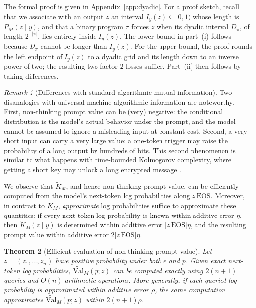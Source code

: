 \documentclass[letterpaper]{article} %
\newtheorem{theorem}{Theorem}[section]
\theoremstyle{definition}
\theoremstyle{remark}
\newtheorem{remark}[theorem]{Remark}
\newcommand{\Val}{\mathrm{Val}}
\newcommand{\eps}{\epsilon}
\newcommand{\EOS}{\mathrm{EOS}}
\begin{document}
The formal proof is given in Appendix~\ref{app:dyadic}. 
For a proof sketch, recall that we associate with an output \(z\) an interval
\(I_y(z)\subseteq[0,1)\) whose length is \(P_M(z\mid y)\), and that a binary
program \(\pi\) forces \(z\) when its dyadic interval \(D_\pi\), of length
\(2^{-|\pi|}\), lies entirely inside \(I_y(z)\). The lower bound in part~(i)
follows because \(D_\pi\) cannot be longer than \(I_y(z)\). For the upper
bound, the proof rounds the left endpoint of \(I_y(z)\) to a dyadic grid and
its length down to an inverse power of two; the resulting two factor-\(2\)
losses suffice. Part~(ii) then follows by taking differences.


\begin{remark}[Differences with standard algorithmic mutual information]\label{rem:leverage}
Two disanalogies with universal-machine algorithmic information are
noteworthy. First, non-thinking prompt value can be (very) negative: the conditional
distribution is the model's actual behavior under the prompt, and the model
cannot be assumed to ignore a misleading input at constant cost. Second, a
very short input can carry a very large value: a one-token trigger may raise
the probability of a long output by hundreds of bits. This second phenomenon
is similar to what happens with time-bounded Kolmogorov complexity, where
getting a short key may unlock a long encrypted message \cite{LM93}.
\end{remark}


We observe that \(\widetilde K_M\), and hence non-thinking prompt value, can be efficiently computed from the model's next-token log probabilities along \(z\,\EOS\). Moreover, in contrast to $K_M$, \emph{approximate} log probabilities suffice to approximate these quantities: if every next-token log probability is known within additive error \(\eta\), then \(\widetilde K_M(z\mid y)\) is determined within additive error \(|z\,\EOS|\eta\), and the resulting prompt value within additive error \(2|z\,\EOS|\eta\).

\begin{theorem}[Efficient evaluation of non-thinking prompt value]
\label{thm:efficient}
Let \(z=(z_1,\ldots,z_n)\) have positive probability under both \(\eps\) and
\(p\).  Given exact next-token log probabilities,
\(\widetilde{\Val}_M(p;z)\) can be computed exactly using \(2(n+1)\) queries
and \(O(n)\) arithmetic operations.  More generally, if each queried log
probability is approximated within additive error \(\rho\), the same computation
approximates \(\widetilde{\Val}_M(p;z)\) within \(2(n+1)\rho\).
\end{theorem}
\end{document}
